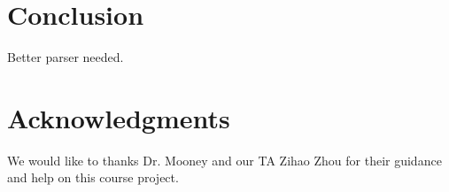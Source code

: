 \section{Conclusion}
\label{sec:length}
Better parser needed. 

\section*{Acknowledgments}
We would like to thanks Dr. Mooney and our TA Zihao Zhou for their guidance and help on this course project. 